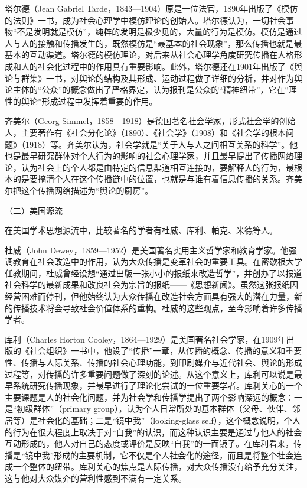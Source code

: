 \documentclass[UTF8,12pt]{ctexart}
\numberwithin{equation}{section} %
\numberwithin{figure}{section}
\numberwithin{table}{section}
\begin{document}
	塔尔德（Jean Gabriel Tarde，1843—1904）原是一位法官，1890年出版了《模仿的法则》一书，成为社会心理学中模仿理论的创始人。塔尔德认为，一切社会事物“不是发明就是模仿”，纯粹的发明是极少见的，大量的行为是模仿。模仿是通过人与人的接触和传播发生的，既然模仿是“最基本的社会现象”，那么传播也就是最基本的互动渠道。塔尔德的模仿理论，对后来从社会心理学角度研究传播在人格形成和人的社会化过程中的作用具有重要影响。此外，塔尔德还在1901年出版了《舆论与群集》一书，对舆论的结构及其形成、运动过程做了详细的分析，并对作为舆论主体的“公众”的概念做出了严格界定，认为报刊是公众的“精神纽带”，它在“理性的舆论”形成过程中发挥着重要的作用。
	
	齐美尔（Georg Simmel，1858—1918）是德国著名社会学家，形式社会学的创始人，主要著作有《社会分化论》（1890）、《社会学》（1908）和《社会学的根本问题》（1918）等。齐美尔认为，社会学就是“关于人与人之间相互关系的科学”。他也是最早研究群体对个人行为的影响的社会心理学家，并且最早提出了传播网络理论，认为社会上的个人都是由特定的信息渠道相互连接的，要解释人的行为，最根本的是要搞清个人在这个传播链中的位置，也就是与谁有着信息传播的关系。齐美尔把这个传播网络描述为“舆论的厨房”。
	
	（二）美国源流
	
	在美国学术思想源流中，比较著名的学者有杜威、库利、帕克、米德等人。
	
	杜威（John Dewey，1859—1952）是美国著名实用主义哲学家和教育学家。他强调教育在社会改造中的作用，认为大众传播是变革社会的重要工具。在密歇根大学任教期间，杜威曾经设想“通过出版一张小小的报纸来改造哲学”，并创办了以报道社会科学的最新成果和改良社会为宗旨的报纸——《思想新闻》。虽然这张报纸因经营困难而停刊，但他始终认为大众传播在改造社会方面具有强大的潜在力量，新的传播技术将会导致社会价值体系的重构。杜威的这些观点，至今影响着许多传播学者。
	
	库利（Charles Horton Cooley，1864—1929）是美国著名社会学家，在1909年出版的《社会组织》一书中，他设了“传播”一章，从传播的概念、传播的意义和重要性、传播与人际关系、传播的社会心理功能，到印刷媒介与近代社会、舆论的形成过程等，对传播的许多重要问题做了深刻的论述。从这个意义上，库利可以说是最早系统研究传播现象，并最早进行了理论化尝试的一位重要学者。库利关心的一个主要课题是人的社会化问题，并为社会学和传播学提出了两个影响深远的概念：一是“初级群体”（primary group），认为个人日常所处的基本群体（父母、伙伴、邻居等）是社会化的基础；二是“镜中我”（looking-glass self），这个概念说明，个人的行为在很大程度上取决于对“自我”的认识，而这种认识主要是通过与他人的社会互动形成的，他人对自己的态度或评价是反映“自我”的一面镜子。在库利看来，传播是“镜中我”形成的主要机制，它不仅是个人社会化的途径，而且是将整个社会连成一个整体的纽带。库利关心的焦点是人际传播，对大众传播没有给予充分关注，这与他对大众媒介的营利性感到不满有一定关系。
	
\end{document}
